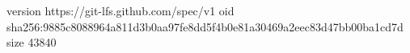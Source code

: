 version https://git-lfs.github.com/spec/v1
oid sha256:9885c8088964a811d3b0aa97fe8dd5f4b0e81a30469a2eec83d47bb00ba1cd7d
size 43840
